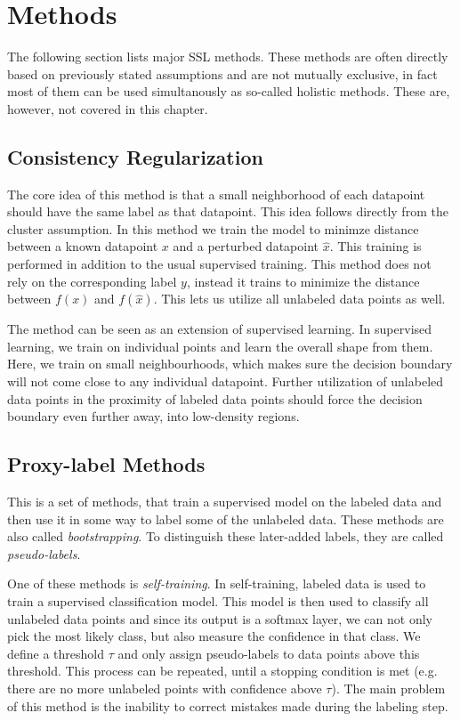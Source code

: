\section{Methods}
\label{sec:SslMethods}

The following section lists major SSL methods. These methods are often directly based on previously stated assumptions and are not mutually exclusive, in fact most of them can be used simultanously as so-called holistic methods. These are, however, not covered in this chapter.


\subsection{Consistency Regularization}

The core idea of this method is that a small neighborhood of each datapoint should have the same label as that datapoint. This idea follows directly from the cluster assumption. In this method we train the model to minimze distance between a known datapoint $x$ and a perturbed datapoint $\hat{x}$. This training is performed in addition to the usual supervised training. This method does not rely on the corresponding label $y$, instead it trains to minimize the distance between $f(x)$ and $f(\hat{x})$. This lets us utilize all unlabeled data points as well.

The method can be seen as an extension of supervised learning. In supervised learning, we train on individual points and learn the overall shape from them. Here, we train on small neighbourhoods, which makes sure the decision boundary will not come close to any individual datapoint. Further utilization of unlabeled data points in the proximity of labeled data points should force the decision boundary even further away, into low-density regions.


\subsection{Proxy-label Methods}

This is a set of methods, that train a supervised model on the labeled data and then use it in some way to label some of the unlabeled data. These methods are also called \emph{bootstrapping}. To distinguish these later-added labels, they are called \emph{pseudo-labels}.

One of these methods is \emph{self-training}. In self-training, labeled data is used to train a supervised classification model. This model is then used to classify all unlabeled data points and since its output is a softmax layer, we can not only pick the most likely class, but also measure the confidence in that class. We define a threshold $\tau$ and only assign pseudo-labels to data points above this threshold. This process can be repeated, until a stopping condition is met (e.g. there are no more unlabeled points with confidence above $\tau$). The main problem of this method is the inability to correct mistakes made during the labeling step.

